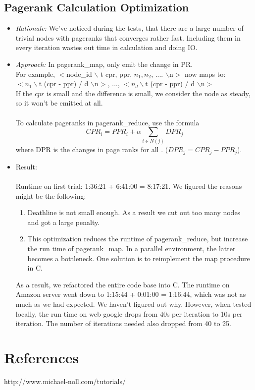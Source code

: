 \documentclass[12pt]{article}
\begin{document}
\subsection{Pagerank Calculation Optimization}
\begin{itemize}
\item \emph{Rationale:} 
We've noticed during the tests, that there are a large number of trivial nodes with pageranks that converges rather fast. Including them in every iteration wastes out time in calculation and doing IO.
\item  \emph{Approach:} 
In pagerank\_map, only emit the change in PR.  \\
For example,  $<$node\_id $\backslash$ t cpr, ppr, $n_1, n_2$, .... $\backslash$n$>$
now maps to:\\
$<n_1 \backslash$t  (cpr - ppr) / d $\backslash$n$>$,  ..., $<n_d \backslash$t  (cpr - ppr) / d  $\backslash$n$>$ \\
If the $cpr$ is small and the difference is small, we consider the node as steady, so it won't be emitted at all. \\\\
To calculate pageranks in pagerank\_reduce, use the formula 
\[CPR_i = PPR_i + \alpha\sum_{i \in N(j)} DPR_j\]
where DPR is the changes in page ranks for all . ($DPR_j = CPR_j - PPR_j$).

\item Result:\\\\
Runtime on first trial: 1:36:21  +  6:41:00  =  8:17:21. We figured the reasons might be the following:
\begin{enumerate}
\item Deathline is not small enough. As a result we cut out too many nodes and got a large penalty. 
\item This optimization reduces the runtime of pagerank\_reduce, but increase the run time of pagerank\_map. In a parallel environment, the latter becomes a bottleneck. One solution is to reimplement the map procedure in C.
\end{enumerate}
As a result, we refactored the entire code base into C.  The runtime on Amazon server went down to  1:15:44  +  0:01:00  =  1:16:44, which was not  as much as we had expected. We haven't figured out why. However, when tested locally, the run time on web google drops from 40s per iteration to 10s per iteration. The number of iterations needed also dropped from 40 to 25.\\

\end{itemize}

\section{References}
http://www.michael-noll.com/tutorials/
\end{document}

